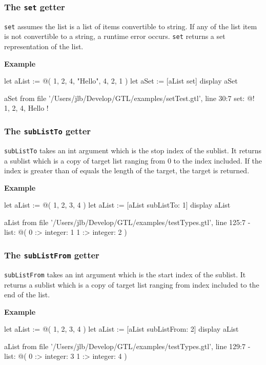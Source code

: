\documentclass[10pt,openright,twosides]{report}
\newcommand{\gtlarg}[1]{{\footnotesize\ttfamily\colorbox{light-blue}{#1}}}
\newcommand{\gtlinline}[1]{\colorbox{light-blue}{\lstinline[language=gtl]{#1}}}
\newcommand{\example}{\vspace{.75em}\noindent\textbf{Example}\vspace{0em}}
\begin{document}
\subsubsection{The \texttt{set} getter}

\gtlinline{set} assumes the list is a list of items convertible to string. If any of the list item is not convertible to a string, a runtime error occurs. \gtlinline{set} returns a set representation of the list.

\example
\begin{gtl}
let aList := @( 1, 2, 4, "Hello", 4, 2, 1 )
let aSet := [aList set]
display aSet
\end{gtl}
\begin{console}
aSet from file '/Users/jlb/Develop/GTL/examples/setTest.gtl', line 30:7
    set: @!
        1, 2, 4, Hello
    !
\end{console}

\subsubsection{The \texttt{subListTo} getter}

\gtlinline{subListTo} takes an int argument which is the stop \gtlarg{index} of the sublist. It returns a sublist which is a copy of target list ranging from 0 to the \gtlarg{index} included. If the \gtlarg{index} is greater than of equals the length of the target, the target is returned.

\example
\begin{gtl}
let aList := @( 1, 2, 3, 4 )
let aList := [aList subListTo: 1]
display aList
\end{gtl}
\begin{console}
aList from file '/Users/jlb/Develop/GTL/examples/testTypes.gtl', line 125:7
  - list: @(
    0 :>
        integer: 1
    1 :>
        integer: 2
)
\end{console}

\subsubsection{The \texttt{subListFrom} getter}

\gtlinline{subListFrom} takes an int argument which is the start \gtlarg{index} of the sublist. It returns a sublist which is a copy of target list ranging from \gtlarg{index} included to the end of the list. 

\example
\begin{gtl}
let aList := @( 1, 2, 3, 4 )
let aList := [aList subListFrom: 2]
display aList
\end{gtl}
\begin{console}
aList from file '/Users/jlb/Develop/GTL/examples/testTypes.gtl', line 129:7
  - list: @(
    0 :>
        integer: 3
    1 :>
        integer: 4
)
\end{console}
\end{document}
